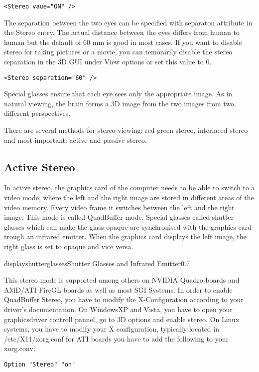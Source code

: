 \small \begin{verbatim}
<Stereo vaue="ON" />
\end{verbatim} \normalsize

The separation between the two eyes can be specified with separaton attribute in the Stereo entry. The actual distance between the eyes differs from human to human but
the default of 60 mm is good in most cases. If you want to disable stereo for taking pictures or a movie, you can temorarily disable the stereo separation in
the 3D GUI under View options or set this value to 0.  

\small \begin{verbatim}
<Stereo separation="60" />
\end{verbatim} \normalsize

Special glasses ensure that each eye sees only the appropriate image. 
As in natural viewing, the brain forms a 3D image from the two images
from two different perspectives.

There are several methods for stereo viewing: red-green stereo, interlaced stereo and most important: active and passive stereo.

\subsection{Active Stereo}
		
In active stereo, the graphics card of the computer needs to be able
to switch to a video mode, where the left and the right image are stored
in different areas of the video memory. Every video frame it
switches between the left and the right image. This mode is called QuadBuffer mode. Special
glasses called shutter glasses which can make the glass opaque are synchronised
with the graphics card trough an infrared emitter. When the graphics card
displays the left image, the right glass is set to opaque and vice versa.

\begin{covimg}{display}{shutterglasses}{Shutter Glasses and Infrared
Emitter}{0.7}\end{covimg}

This stereo mode is supported among others on NVIDIA Quadro boards and AMD/ATI FireGL boards as well as most SGI Systems.
In order to enable QuadBuffer Stereo, you have to modify the X-Configuration according to your driver's documentation.
On WindowsXP and Vista, you have to open your graphicsdriver controll pannel, go to 3D options and enable stereo.
On Linux systems, you have to modify your X configuration, typically located in /etc/X11/xorg.conf
for ATI boards you have to add the following to your xorg.conv:
\begin{samepage}
\small \begin{verbatim}
Option "Stereo" "on"
\end{verbatim} \normalsize
\end{samepage}

